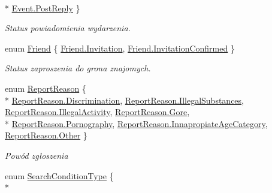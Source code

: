 \begin{DoxyCompactItemize}
\\*
\hyperlink{namespace_contract_1_1_enums_a195bd5eea92e011927a1913b01a0c517a93f64b01f9b6e27942c3032355984b9b}{Event.\+Post\+Reply}
 \}
\begin{DoxyCompactList}\small\item\em Status powiadomienia wydarzenia. \end{DoxyCompactList}\item 
enum \hyperlink{namespace_contract_1_1_enums_a7afaa026c7bacb561f6960408bf39e8f}{Friend} \{ \hyperlink{namespace_contract_1_1_enums_a7afaa026c7bacb561f6960408bf39e8fa0ba011066a589576daee32a58e9b81cd}{Friend.\+Invitation}, 
\hyperlink{namespace_contract_1_1_enums_a7afaa026c7bacb561f6960408bf39e8fa14fbf98840652b569611c30f17c1518a}{Friend.\+Invitation\+Confirmed}
 \}
\begin{DoxyCompactList}\small\item\em Status zaproszenia do grona znajomych. \end{DoxyCompactList}\item 
enum \hyperlink{namespace_contract_1_1_enums_a0d95ee1a4b421547e10b83b6e069abdf}{Report\+Reason} \{ \\*
\hyperlink{namespace_contract_1_1_enums_a0d95ee1a4b421547e10b83b6e069abdfa6c5fb76d5902956dee0c0cda6c38ddfe}{Report\+Reason.\+Discrimination}, 
\hyperlink{namespace_contract_1_1_enums_a0d95ee1a4b421547e10b83b6e069abdfa55af0877395be017b8c5fcdab23d4d2e}{Report\+Reason.\+Illegal\+Substances}, 
\hyperlink{namespace_contract_1_1_enums_a0d95ee1a4b421547e10b83b6e069abdfa8e333cf086491a76cfbbccec5036a92a}{Report\+Reason.\+Illegal\+Activity}, 
\hyperlink{namespace_contract_1_1_enums_a0d95ee1a4b421547e10b83b6e069abdfaa2af13cc96c7143873db4fb2c0119e82}{Report\+Reason.\+Gore}, 
\\*
\hyperlink{namespace_contract_1_1_enums_a0d95ee1a4b421547e10b83b6e069abdfa3a8dbbbf0eb3b9cbb7fa1dbbced57907}{Report\+Reason.\+Pornography}, 
\hyperlink{namespace_contract_1_1_enums_a0d95ee1a4b421547e10b83b6e069abdfac6a741672934d9cccbb71fa8def9874b}{Report\+Reason.\+Innapropiate\+Age\+Category}, 
\hyperlink{namespace_contract_1_1_enums_a0d95ee1a4b421547e10b83b6e069abdfa6311ae17c1ee52b36e68aaf4ad066387}{Report\+Reason.\+Other}
 \}
\begin{DoxyCompactList}\small\item\em Powód zgłoszenia \end{DoxyCompactList}\item 
enum \hyperlink{namespace_contract_1_1_enums_aaec9cf8d7ed5b1eb4f9b9252c3ac10aa}{Search\+Condition\+Type} \{ \\*

\end{DoxyCompactItemize}
